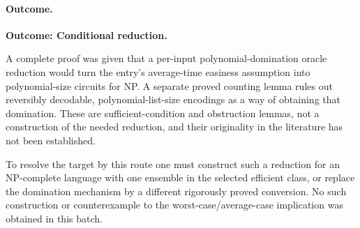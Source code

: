 \documentclass[11pt]{article}
\begin{document}
\paragraph{Outcome.}
\textbf{Outcome: Conditional reduction.}

A complete proof was given that a per-input polynomial-domination oracle
reduction would turn the entry's average-time easiness assumption into
polynomial-size circuits for NP. A separate proved counting lemma rules
out reversibly decodable, polynomial-list-size encodings as a way of
obtaining that domination. These are sufficient-condition and obstruction
lemmas, not a construction of the needed reduction, and their originality
in the literature has not been established.

To resolve the target by this route one must construct such a reduction
for an NP-complete language with one ensemble in the selected efficient
class, or replace the domination mechanism by a different rigorously
proved conversion. No such construction or counterexample to the
worst-case/average-case implication was obtained in this batch.
\end{document}
